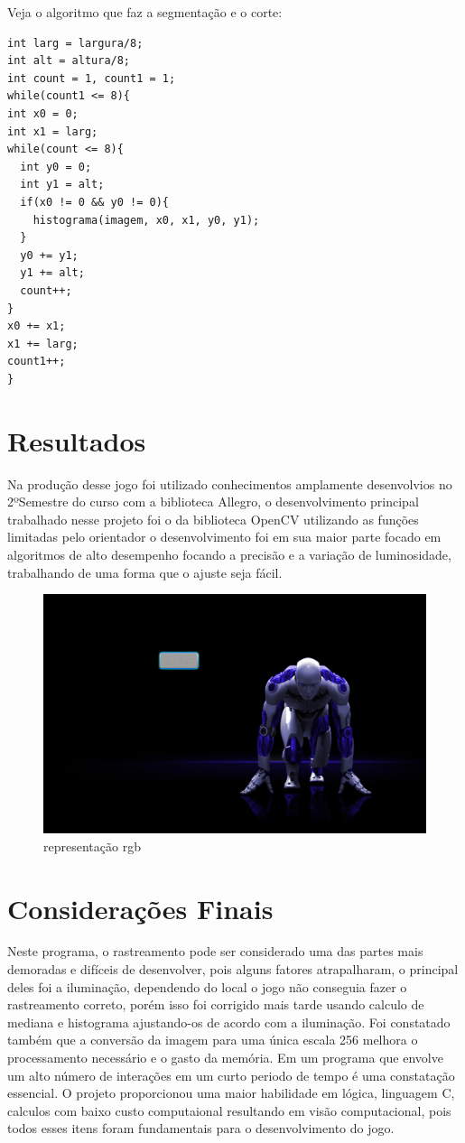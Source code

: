 \documentclass[a4paper]{article}
\begin{document}
\begin{enumerate}
Veja o algoritmo que faz a segmentação e o corte:

\begin{lstlisting}
int larg = largura/8;
int alt = altura/8;
int count = 1, count1 = 1;
while(count1 <= 8){
int x0 = 0; 
int x1 = larg;
while(count <= 8){
  int y0 = 0;
  int y1 = alt;
  if(x0 != 0 && y0 != 0){
    histograma(imagem, x0, x1, y0, y1);
  }
  y0 += y1;
  y1 += alt;
  count++;
}
x0 += x1;
x1 += larg;
count1++;
}
\end{lstlisting}
\end{enumerate}
\section*{Resultados}
Na produção desse jogo foi utilizado conhecimentos amplamente desenvolvios no 2ºSemestre do curso com a biblioteca Allegro, o desenvolvimento principal trabalhado nesse projeto foi o da biblioteca OpenCV utilizando as funções limitadas pelo orientador o desenvolvimento foi em sua maior parte focado em algoritmos de alto desempenho focando a precisão e a variação de luminosidade, trabalhando de uma forma que o ajuste seja fácil.
\begin{figure}[!htb]
\centering
\includegraphics{robot.jpg}
\caption{representação rgb}
\label{Rotulo}
\end{figure}
\section*{Considerações Finais}
Neste programa, o rastreamento pode ser considerado uma das partes mais demoradas e difíceis de desenvolver, pois alguns fatores atrapalharam, o principal deles foi a iluminação, dependendo do local o jogo não conseguia fazer o rastreamento correto, porém isso foi corrigido mais tarde usando calculo de mediana e histograma ajustando-os de acordo com a iluminação. Foi constatado também que a conversão da imagem para uma única escala 256 melhora o processamento necessário e o gasto da memória. Em um programa que envolve um alto número de interações em um curto periodo de tempo é uma constatação essencial.
O projeto proporcionou uma maior habilidade em lógica, linguagem C, calculos com baixo custo computaional resultando em  visão computacional, pois todos esses itens foram fundamentais para o desenvolvimento do jogo.
\end{document}
